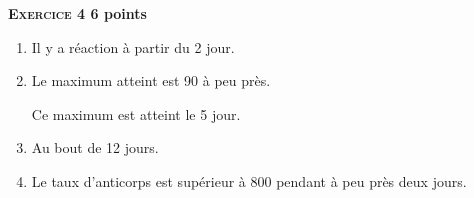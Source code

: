 \textbf{\textsc{Exercice 4} \hfill 6 points}

\medskip 

%
%
%
%
%
%

\begin{enumerate}
\item %
Il y a réaction à partir du 2 jour. 
\item %
Le maximum atteint est 90 à peu près.

Ce maximum est atteint le 5 jour.
\item %
Au bout de 12 jours. 
\item %
Le taux d'anticorps est supérieur à 800 pendant à peu près deux jours. 
\end{enumerate}

\vspace{0,5cm}

